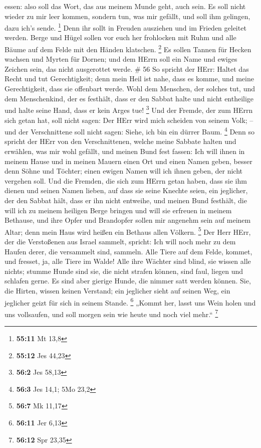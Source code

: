 essen:  also soll das Wort, das aus meinem Munde geht, auch
sein. Es soll nicht wieder zu mir leer kommen, sondern tun, was mir
gefällt, und soll ihm gelingen, dazu ich's sende. \footnote{\textbf{55:11}
  Mt 13,8}  Denn ihr sollt in Freuden ausziehen und im
Frieden geleitet werden. Berge und Hügel sollen vor euch her frohlocken
mit Ruhm und alle Bäume auf dem Felde mit den Händen klatschen.
\footnote{\textbf{55:12} Jes 44,23}  Es sollen Tannen für
Hecken wachsen und Myrten für Dornen; und dem HErrn soll ein Name und
ewiges Zeichen sein, das nicht ausgerottet werde. \# 56  So
spricht der HErr: Haltet das Recht und tut Gerechtigkeit; denn mein Heil
ist nahe, dass es komme, und meine Gerechtigkeit, dass sie offenbart
werde.  Wohl dem Menschen, der solches tut, und dem
Menschenkind, der es festhält, dass er den Sabbat halte und nicht
entheilige und halte seine Hand, dass er kein Arges tue! \footnote{\textbf{56:2}
  Jes 58,13}  Und der Fremde, der zum HErrn sich getan hat,
soll nicht sagen: Der HErr wird mich scheiden von seinem Volk; -- und
der Verschnittene soll nicht sagen: Siehe, ich bin ein dürrer Baum.
\footnote{\textbf{56:3} Jes 14,1; 5Mo 23,2}  Denn so spricht
der HErr von den Verschnittenen, welche meine Sabbate halten und
erwählen, was mir wohl gefällt, und meinen Bund fest fassen:
 Ich will ihnen in meinem Hause und in meinen Mauern einen
Ort und einen Namen geben, besser denn Söhne und Töchter; einen ewigen
Namen will ich ihnen geben, der nicht vergehen soll.  Und
die Fremden, die sich zum HErrn getan haben, dass sie ihm dienen und
seinen Namen lieben, auf dass sie seine Knechte seien, ein jeglicher,
der den Sabbat hält, dass er ihn nicht entweihe, und meinen Bund
festhält,  die will ich zu meinem heiligen Berge bringen und
will sie erfreuen in meinem Bethause, und ihre Opfer und Brandopfer
sollen mir angenehm sein auf meinem Altar; denn mein Haus wird heißen
ein Bethaus allen Völkern. \footnote{\textbf{56:7} Mk 11,17}
 Der Herr HErr, der die Verstoßenen aus Israel sammelt,
spricht: Ich will noch mehr zu dem Haufen derer, die versammelt sind,
sammeln.  Alle Tiere auf dem Felde, kommet, und fresset, ja,
alle Tiere im Walde!  Alle ihre Wächter sind blind, sie
wissen alle nichts; stumme Hunde sind sie, die nicht strafen können,
sind faul, liegen und schlafen gerne.  Es sind aber gierige
Hunde, die nimmer satt werden können. Sie, die Hirten, wissen keinen
Verstand; ein jeglicher sieht auf seinen Weg, ein jeglicher geizt für
sich in seinem Stande. \footnote{\textbf{56:11} Jer 6,13} 
„Kommt her, lasst uns Wein holen und uns vollsaufen, und soll morgen
sein wie heute und noch viel mehr.`` \footnote{\textbf{56:12} Spr 23,35}

